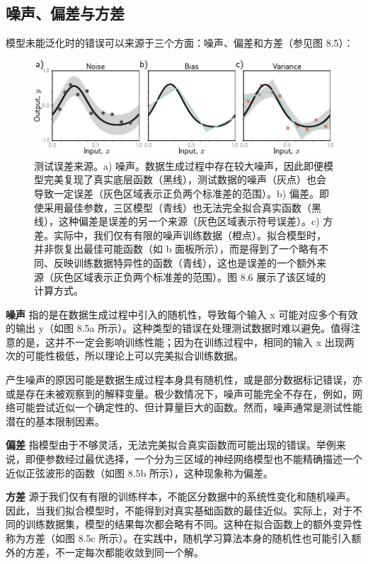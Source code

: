 \documentclass[lang=cn,newtx,10pt,scheme=chinese]{elegantbook}
\begin{document}
\subsection{噪声、偏差与方差}
模型未能泛化时的错误可以来源于三个方面：噪声、偏差和方差（参见图 8.5）：

\begin{figure}[ht!]
\centering
\includegraphics[width=0.7\linewidth]{PDFFigures/UDLChap8PDF/PerfNoiseBiasVariance.pdf}
\caption{测试误差来源。a) 噪声。数据生成过程中存在较大噪声，因此即便模型完美复现了真实底层函数（黑线），测试数据的噪声（灰点）也会导致一定误差（灰色区域表示正负两个标准差的范围）。b) 偏差。即使采用最佳参数，三区模型（青线）也无法完全拟合真实函数（黑线），这种偏差是误差的另一个来源（灰色区域表示符号误差）。c) 方差。实际中，我们仅有有限的噪声训练数据（橙点）。拟合模型时，并非恢复出最佳可能函数（如 b 面板所示），而是得到了一个略有不同、反映训练数据特异性的函数（青线），这也是误差的一个额外来源（灰色区域表示正负两个标准差的范围）。图 8.6 展示了该区域的计算方式。}
\end{figure}


\textbf{噪声} 指的是在数据生成过程中引入的随机性，导致每个输入 x 可能对应多个有效的输出 y（如图 8.5a 所示）。这种类型的错误在处理测试数据时难以避免。值得注意的是，这并不一定会影响训练性能；因为在训练过程中，相同的输入 x 出现两次的可能性极低，所以理论上可以完美拟合训练数据。

产生噪声的原因可能是数据生成过程本身具有随机性，或是部分数据标记错误，亦或是存在未被观察到的解释变量。极少数情况下，噪声可能完全不存在，例如，网络可能尝试近似一个确定性的、但计算量巨大的函数。然而，噪声通常是测试性能潜在的基本限制因素。

\textbf{偏差} 指模型由于不够灵活，无法完美拟合真实函数而可能出现的错误。举例来说，即便参数经过最优选择，一个分为三区域的神经网络模型也不能精确描述一个近似正弦波形的函数（如图 8.5b 所示），这种现象称为偏差。

\textbf{方差} 源于我们仅有有限的训练样本，不能区分数据中的系统性变化和随机噪声。因此，当我们拟合模型时，不能得到对真实基础函数的最佳近似。实际上，对于不同的训练数据集，模型的结果每次都会略有不同。这种在拟合函数上的额外变异性称为方差（如图 8.5c 所示）。在实践中，随机学习算法本身的随机性也可能引入额外的方差，不一定每次都能收敛到同一个解。
\end{document}
